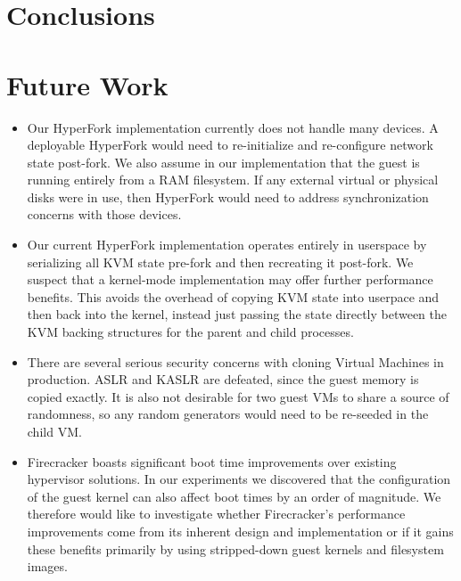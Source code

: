 \section{Conclusions} \label{sec:conclusions}

\section{Future Work}



\begin{itemize}
  \item Our HyperFork implementation currently does not handle many devices. A deployable HyperFork would need to re-initialize and re-configure network state post-fork. We also assume in our implementation that the guest is running entirely from a RAM filesystem. If any external virtual or physical disks were in use, then HyperFork would need to address synchronization concerns with those devices.
  \item Our current HyperFork implementation operates entirely in userspace by serializing all KVM state pre-fork and then recreating it post-fork. We suspect that a kernel-mode implementation may offer further performance benefits. This avoids the overhead of copying KVM state into userpace and then back into the kernel, instead just passing the state directly between the KVM backing structures for the parent and child processes.
  \item There are several serious security concerns with cloning Virtual Machines in production. ASLR and KASLR are defeated, since the guest memory is copied exactly. It is also not desirable for two guest VMs to share a source of randomness, so any random generators would need to be re-seeded in the child VM.
  \item Firecracker boasts significant boot time improvements over existing hypervisor solutions. In our experiments we discovered that the configuration of the guest kernel can also affect boot times by an order of magnitude. We therefore would like to investigate whether Firecracker's performance improvements come from its inherent design and implementation or if it gains these benefits primarily by using stripped-down guest kernels and filesystem images.
\end{itemize}
